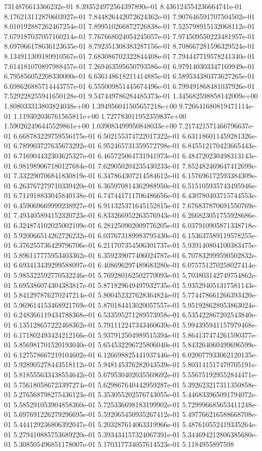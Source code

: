 7314876613366232e-01	8.393524972564397890e-01	8.436124554236664741e-01	8.176213112870603927e-01	7.844826442072624362e-01	7.907646591707504502e-01	8.010192887262467254e-01	7.899510266872726838e-01	7.525798915132068112e-01	7.679187037057160214e-01	7.767668024054245057e-01	7.974509550223481957e-01	8.697066178636123635e-01	8.792351308383287156e-01	8.708667281596329524e-01	8.134911309189910567e-01	7.683086702322844408e-01	7.794447719578241340e-01	7.614181070897988457e-01	7.269463595650793586e-01	6.979140303347169949e-01	6.795856052208330000e-01	6.636148618211414885e-01	6.589534380373627265e-01	6.698626885714443757e-01	6.555009851445674496e-01	6.799491868481037926e-01	7.529228255941650128e-01	9.547449786284485373e-01	1.345682598858142009e+00	1.808033313803824038e+00	1.394956041505657218e+00	9.726641680819471114e-01	1.119302036761565811e+00	1.727783011952359837e+00	1.590262496445529861e+00	1.039083499950848033e+00	7.217421571466796637e-01	6.668783229759556175e-01	6.502155374722017322e-01	6.631186011459281326e-01	6.789903727635673292e-01	6.952465731359572798e-01	6.845512170423665443e-01	6.716904432303625327e-01	6.465725064731941973e-01	6.484720230498313143e-01	6.981989067180127684e-01	7.629050204235430233e-01	7.852482469647412699e-01	7.332290706841830819e-01	6.347864307214584612e-01	6.157696172593384309e-01	6.263767279710339420e-01	6.365970814362988950e-01	6.515105935743495946e-01	6.711918833045840138e-01	6.747441711706486656e-01	6.430780403715744553e-01	6.459069669999238927e-01	6.911325371645152815e-01	7.676837870691550769e-01	7.493405894152320723e-01	6.833266952263576943e-01	6.266823051755928686e-01	6.324874102025002109e-01	6.281250902009776205e-01	6.037910905871338718e-01	5.920066514262726232e-01	6.037673189983795430e-01	6.153637589119578255e-01	6.376255736429796706e-01	6.211707354506301737e-01	5.939140804100383475e-01	5.896117775953403362e-01	6.359239077406024787e-01	6.707832999590502832e-01	6.693413439299588097e-01	6.408696297489683280e-01	6.075751270258027414e-01	5.985322592770532246e-01	5.769280162502770093e-01	5.703803142749754862e-01	5.695386074304383817e-01	5.871829649497932735e-01	5.935294051317581143e-01	5.841297876270247214e-01	5.800452327628364824e-01	5.774478661266393420e-01	5.969614153468921769e-01	5.870184413020057557e-01	5.951928628053863024e-01	6.248366119434788368e-01	6.533595271289573958e-01	6.535422867202543840e-01	6.135128657222468362e-01	5.791112247343460639e-01	5.994395941157979468e-01	6.171802493424212166e-01	5.937912504989515394e-01	5.864137474261590377e-01	5.856981701520193040e-01	5.654532296725806040e-01	5.843264060499696599e-01	6.127578667219104602e-01	6.126698825441937446e-01	6.020077933062120135e-01	5.928905278443518112e-01	5.948145376282043539e-01	5.803141517479705191e-01	5.818555633438554642e-01	5.679530402035569692e-01	5.556751929552844471e-01	5.756180586723397274e-01	5.629867640442959287e-01	5.392623217311350858e-01	5.276568798275436123e-01	5.353055202576743055e-01	5.446833965091794072e-01	5.585291053904858360e-01	5.725336698183199902e-01	5.729996685653411248e-01	5.697691226279296695e-01	5.592065450935267412e-01	5.497766216588668708e-01	5.444129236806392047e-01	5.203287614063319966e-01	5.487610552419335264e-01	5.279410885753689220e-01	5.393434157324067391e-01	5.344694212806385680e-01	5.308505496851178007e-01	5.170317734057614523e-01	5.1184955897598